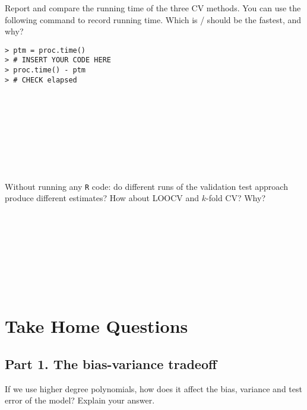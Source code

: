 \documentclass{article}
\begin{document}
Report and compare the running time of the three CV methods. You can use the
following command to record running time. Which is / should be the fastest, and
why?
\begin{Verbatim}[frame=single]
> ptm = proc.time()
> # INSERT YOUR CODE HERE
> proc.time() - ptm
> # CHECK elapsed
\end{Verbatim}

\begin{Verbatim}[frame=single]









\end{Verbatim}

Without running any \texttt{R} code: do different runs of the validation test
approach produce different estimates? How about LOOCV and $k$-fold CV? Why?

\begin{Verbatim}[frame=single]









\end{Verbatim}

\bigskip

\section*{Take Home Questions}

\subsection*{Part 1. The bias-variance tradeoff}

If we use higher degree polynomials, how does it affect the bias, variance and test error of the model? Explain your answer.
\begin{Verbatim}[frame=single]



\end{Verbatim}
\end{document}
